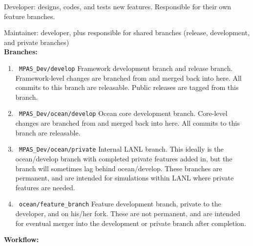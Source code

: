 \documentclass[11pt]{article}
\begin{document}
Developer: designs, codes, and tests new features.  Responsible for their own feature branches.

Maintainer: developer, plus responsible for shared branches (release, development, and private branches)\\

{\bf Branches:}
\begin{enumerate}
\item \verb| MPAS_Dev/develop|  Framework development branch and release branch.  Framework-level changes are branched from and merged back into here.   All commits to this branch are releasable.  Public releases are tagged from this branch.

\item \verb| MPAS_Dev/ocean/develop|  Ocean core development branch.  Core-level changes are branched from and merged back into here.  All commits to this branch are releasable.

\item \verb| MPAS_Dev/ocean/private|  Internal LANL branch.  This ideally is the ocean/develop branch with completed private features added in, but the branch will sometimes lag behind ocean/develop.  These branches are permanent, and are intended for simulations within LANL where private features are needed.

\item \verb| ocean/feature_branch|  Feature development branch, private to the developer, and on his/her fork.  These are not permanent, and are intended for eventual merger into the development or private branch after completion.
\end{enumerate}

{\bf Workflow:}
\end{document}
